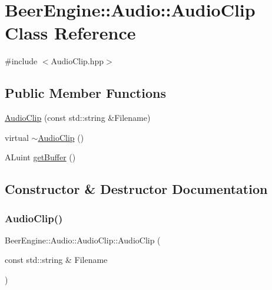 \hypertarget{class_beer_engine_1_1_audio_1_1_audio_clip}{}\section{Beer\+Engine\+:\+:Audio\+:\+:Audio\+Clip Class Reference}
\label{class_beer_engine_1_1_audio_1_1_audio_clip}


{\ttfamily \#include $<$Audio\+Clip.\+hpp$>$}

\subsection*{Public Member Functions}
\begin{DoxyCompactItemize}
\item 
\mbox{\hyperlink{class_beer_engine_1_1_audio_1_1_audio_clip_a772f38ce051240a286fcb90d8d107e08}{Audio\+Clip}} (const std\+::string \&Filename)
\item 
virtual \mbox{\hyperlink{class_beer_engine_1_1_audio_1_1_audio_clip_a3ccd8ba4bcb6652acaaa05a8313be1b2}{$\sim$\+Audio\+Clip}} ()
\item 
A\+Luint \mbox{\hyperlink{class_beer_engine_1_1_audio_1_1_audio_clip_a02ffa4d4a75311f1a4d59b49e236a07e}{get\+Buffer}} ()
\end{DoxyCompactItemize}


\subsection{Constructor \& Destructor Documentation}
\mbox{\label{class_beer_engine_1_1_audio_1_1_audio_clip_a772f38ce051240a286fcb90d8d107e08}} 
\subsubsection{\texorpdfstring{Audio\+Clip()}{AudioClip()}}
{\footnotesize\ttfamily Beer\+Engine\+::\+Audio\+::\+Audio\+Clip\+::\+Audio\+Clip (\begin{DoxyParamCaption}\item[{const std\+::string \&}]{Filename }\end{DoxyParamCaption})}

